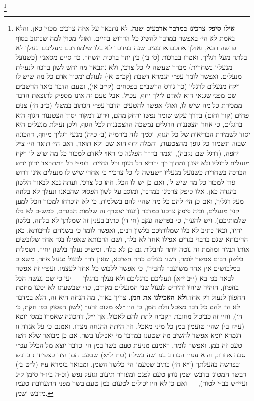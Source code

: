 \documentclass[12pt, openany]{book}
\newcommand{\footnotecomment}[1]{
	\renewcommand\thefootnote{}
	\footnote{\textsf{#1}}}
\newcommand{\commenta}[1]{\footnotecomment{#1}\hspace{0em}}
\begin{document}
\commenta{\textrm{\textbf{אילו סיפק צרכינו במדבר ארבעים שנה.}} לא נתבאר על איזה צרכים מכוין כאן, והלא באמת לא הי׳ באפשר במדבר להשיג כל הדרוש בחיים. ואולי מכוין למה שכתוב בסוף פרשה תבא, ואולך אתכם ארבעים שנה במדבר לא בלו שלמותיכם מעליכם ונעלך לא בלתה מעל רגליך, ואמרו בברכות (ס׳ ב׳) בין יתר ברכות השחר, כד סיים מסאני׳ (כשנועל מנעליו בשחרית) מברך שעשה לי כל צרכי, ולא נתבאר מה יחש לשון ברכה לנעילת מנעלים. ואפשר לומר עפ״י הגמרא דשבת (קכ״ט א׳) לעולם ימכור אדם כל מה שיש לו ויקח מנעלים לרגליו (כך גורס הרשב״ם בפסחים (קי״ב א׳), וטעם הדבר ביאר הרשב״ם שם מפני שגנאי הוא לאדם לילך יחף, עכ״ל. אבל טעם זה אינו מספיק לתוצאת הדבר ממכירת כל מה שיש לו, ואולי אפשר להטעים הדבר עפ״י הכתוב במשלי (כ״ב ח׳) צנים פחים (קור וחום) בדרך עקש שומר נפשו ירחק מהם, וידוע דמקור יסוד הצטננות הגוף הוא ברגלים, כי אחר הצטננות הרגלים נמשכה ההצטננות לכל הגוף, ולכן נעילת מנעלים היא יסוד לשמירת הבריאות של כל הגוף, וסמך לזה בירמיה (ב׳ כ״ה) מנעי רגליך מיחף, דהכונה שבזה תשמור כל גופך מהצטננות, והמלה יחף הוא שם ולא תואר, דאם הי׳ תואר הי׳ צ״ל יחפה, (דרגל שם נקבה), ואמר בדרך הפלגה כי ראוי לאדם למכור כל מה שיש לו ויקח מנעלים לרגליו ולא יצננן ומתוך כך יבריא כל הגוף וכל החיים.  ועפ״י כל המתבאר יכוון יחש הברכה בשחרית כשנועל מנעליו ״שעשה לי כל צרכי״ כי אחרי שיש לו מנעלים אינו דרוש עוד למכור כל מה שיש לו, ואם כן יש לו הכל, וזהו כל צרכי. ועתה נבא לבאור הלשון בהגדה כאן. אלו סיפק צרכינו במדבר, ומוסב על לשון הפסוק שהבאנו ונעלך לא בלתה מעל רגליך, ואם כן הי׳ להם כל מה שהי׳ להם בשלמות, כי לא הוכרחו למכור הכל למען קנין מנעלים, ובזה סיפק צרכנו במדבר (ועוד יצטרף זה שלמות הבגדים, כמש״כ לא בלו שלמותיכם). ויש להעיר, כי בפרשה עקב (ח׳ ד׳) כתיב בענין זה שמלתך לא בלתה, בלשון יחיד, וכאן כתיב לא בלו שמלותיכם בלשון רבים, ואפשר לומר כי בשניהם לריבותא, כאן הריבותא שגם ברבוי בגדים אפילו אחד לא בלה, ושם הרבותא שאפילו בגד אחד שלובשים אותו תמיד ומחמת זה נוטה יותר להבלות גם כן לא בלה. ומש״כ נעלך בלשון יחיד, ושמלות בלשון רבים אפשר לומר, דשני נעלים כחד חשיבא, שאין דרך לנעול מנעל אחד, משא״כ במלבושים אין אחד משועבד לחבירו, כי אפשר ללבוש כל אחד לעצמו. ועפ״י זה אפשר לבאר בפ׳ בא (י״ב י״א) ונעליכם ברגליכם ולא נעלך ברגלך — יען כי שם נעשה הכל בחפזון, הזהיר שיהיו זהירים לנעול שני המנעלים מקודם, כדי שבשעתו לא יטעו מחמת החפזון לנעול רק אחד.\textrm{\textbf{ולא האכילנו את המן.}} צריך באור, מה הנחה היא זה, הלא במדבר לא הי׳ להם כל דבר מאכל זולת המן, כי הי׳ ״לא מקום זרע״ (לשון הפסוק בפ׳ חקת, כ׳ ה׳), והי׳ זה כביכול מחובת הקב״ה לתת להם לאכול. אך י״ל, דהכונה שאמרו במס׳ יומא (ע״ה ב׳) שהיו טועמין במן כל מיני מאכל, וזה היתה ההנחה מצדו. ואמנם כי על אגדה זו דגמרא יומא אפשר להשיב מה שטענו במדבר מי יאכילנו בשר, אם כן מבואר שלא חשו טעם זה במן. ואפשר לומר, דאמנם מניעת טעם בשר במן הי׳ כדבר יוצא מל הכלל עפ״י סבה אחרת, והוא עפ״י הכתוב בפרשה בשלח (ט״ז ל״א) שטעם המן היה כצפיחית בדבש ובפרשה בהעלתך (י״א ח׳) כתיב שטעמו הי׳ כלשד השמן, ומבואר בגמרא ע״ז (ל״ט ב׳) דבשר המטוגן בדבש ושמן נותן טעם לפגם ומעורר תיעוב וגועל נפש (וכ״ה ביו״ד סימן ק״ג ועיי״ש בב״י לטור), — ואם כן לא היו יכולים לטעום במן טעם בשר מפני התערובת טעמו מדבש ושמן.}%
\end{document}
